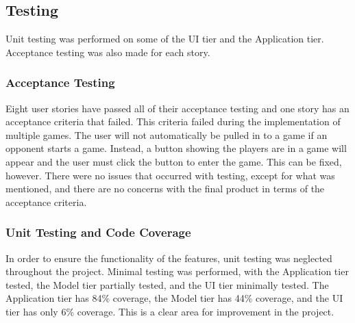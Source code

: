 \hypertarget{testing}{%
\subsection{Testing}\label{testing}}

Unit testing was performed on some of the UI tier and the Application
tier. Acceptance testing was also made for each story.

\hypertarget{acceptance-testing}{%
\subsubsection{Acceptance Testing}\label{acceptance-testing}}

Eight user stories have passed all of their acceptance testing and one
story has an acceptance criteria that failed. This criteria failed
during the implementation of multiple games. The user will not
automatically be pulled in to a game if an opponent starts a game.
Instead, a button showing the players are in a game will appear and the
user must click the button to enter the game. This can be fixed,
however. There were no issues that occurred with testing, except for
what was mentioned, and there are no concerns with the final product in
terms of the acceptance criteria.

\hypertarget{unit-testing-and-code-coverage}{%
\subsubsection{Unit Testing and Code
Coverage}\label{unit-testing-and-code-coverage}}

In order to ensure the functionality of the features, unit testing was
neglected throughout the project. Minimal testing was performed, with
the Application tier tested, the Model tier partially tested, and the UI
tier minimally tested. The Application tier has 84\% coverage, the Model
tier has 44\% coverage, and the UI tier has only 6\% coverage. This is a
clear area for improvement in the project.
